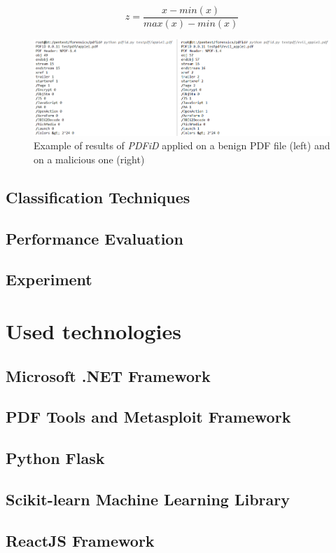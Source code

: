 \begin{equation}
	\label{eq:1}
	z = \frac{x - min(x)}{max(x) - min(x)}
\end{equation}

\begin{figure}[H]
	\centerline{\includegraphics[scale=0.6]{figures/pdfidoutput.png}}  
	\caption{Example of results of \textit{PDFiD} applied on a benign PDF file (left) and on a malicious one (right)}
	\label{pdfidoutput}
\end{figure}

\subsection{Classification Techniques}
\subsection{Performance Evaluation}
\subsection{Experiment}     %

\section{Used technologies}
\label{section:technologies}
\subsection{Microsoft .NET Framework}
\subsection{PDF Tools and Metasploit Framework}
\cite{zeltser}
\subsection{Python Flask}
\subsection{Scikit-learn Machine Learning Library}
\subsection{ReactJS Framework}
